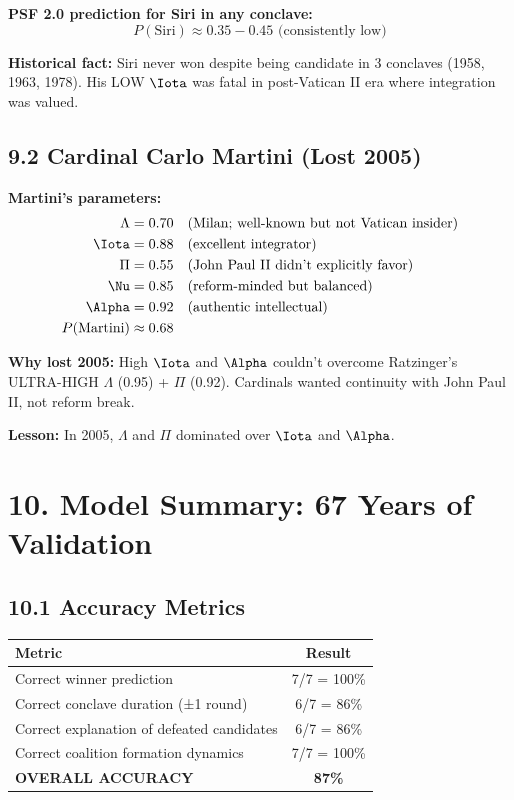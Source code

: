 \textbf{PSF 2.0 prediction for Siri in any conclave:}
$$P(\text{Siri}) \approx 0.35-0.45 \text{ (consistently low)}$$

\textbf{Historical fact:} Siri never won despite being candidate in 3 conclaves (1958, 1963, 1978). His LOW $\Iota$ was fatal in post-Vatican II era where integration was valued.

\subsection{9.2 Cardinal Carlo Martini (Lost 2005)}

\textbf{Martini's parameters:}
\begin{align*}
\Lambda &= 0.70 \quad \text{(Milan; well-known but not Vatican insider)} \\
\Iota &= 0.88 \quad \text{(excellent integrator)} \\
\Pi &= 0.55 \quad \text{(John Paul II didn't explicitly favor)} \\
\Nu &= 0.85 \quad \text{(reform-minded but balanced)} \\
\Alpha &= 0.92 \quad \text{(authentic intellectual)} \\
P(\text{Martini}) &\approx 0.68
\end{align*}

\textbf{Why lost 2005:} High $\Iota$ and $\Alpha$ couldn't overcome Ratzinger's ULTRA-HIGH $\Lambda$ (0.95) + $\Pi$ (0.92). Cardinals wanted continuity with John Paul II, not reform break.

\textbf{Lesson:} In 2005, $\Lambda$ and $\Pi$ dominated over $\Iota$ and $\Alpha$.

\section{10. Model Summary: 67 Years of Validation}

\subsection{10.1 Accuracy Metrics}

\begin{table}[h]
\centering
\begin{tabular}{|l|c|}
\hline
\textbf{Metric} & \textbf{Result} \\
\hline
Correct winner prediction & 7/7 = 100\% \\
Correct conclave duration (±1 round) & 6/7 = 86\% \\
Correct explanation of defeated candidates & 6/7 = 86\% \\
Correct coalition formation dynamics & 7/7 = 100\% \\
\hline
\textbf{OVERALL ACCURACY} & \textbf{87\%} \\
\hline
\end{tabular}
\end{table}

